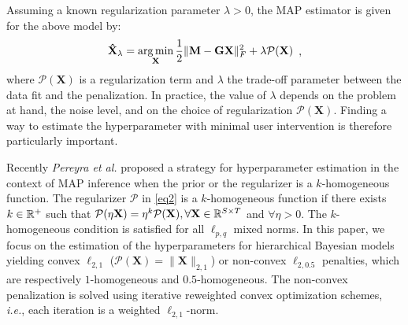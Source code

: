 Assuming a known regularization parameter $\lambda > 0$, the MAP estimator is given for the above model by:
\begin{equation} \label{eq2}
\begin{aligned}
    \mathbf{\hat{X}}_\lambda = \mathop{\mathrm{arg}\,\mathrm{min}}_{\mathbf{X}} \frac{1}{2}\|\mathbf{M - GX}\|^2_{F} + \lambda\mathcal{P}(\mathbf{X}) \\
\end{aligned} \enspace ,
\end{equation}
where $\mathcal{P}(\mathbf{X})$ is a regularization term and $\lambda$ the trade-off parameter between the data fit and the penalization.
%
In practice, the value of $\lambda$ depends on the problem at hand, the noise level, and on the choice of regularization $\mathcal{P}(\mathbf{X})$.
Finding a way to estimate the hyperparameter with minimal user intervention is therefore particularly important.

Recently \textit{Pereyra et al.} \cite{Figueiredo} proposed a strategy for hyperparameter estimation in the context of MAP inference when the prior or the regularizer is a $k$-homogeneous function. The regularizer $\mathcal{P}$ in \eqref{eq2} is a $k$-homogeneous function if there exists $k\in\mathbb{R}^+$ such that $\mathcal{P}(\eta \mathbf{X}) = \eta^k\mathcal{P}(\mathbf{X}), \forall \mathbf{X}\in\mathbb{R}^{S\times T}$ and $\forall \eta > 0$. The $k$-homogeneous condition is satisfied for all $\ell_{p,q}$ mixed norms. In this paper, we focus on the estimation of the hyperparameters for hierarchical Bayesian models yielding convex $\ell_{2,1}$ ($\mathcal{P}(\mathbf{X})=\|\mathbf{X}\|_{2,1}$) or non-convex $\ell_{2,0.5}$ penalties, which are respectively $1$-homogeneous and $0.5$-homogeneous. The non-convex penalization is solved using iterative reweighted convex optimization schemes, \textit{i.e.}, each iteration is a weighted $\ell_{2,1}$-norm.

